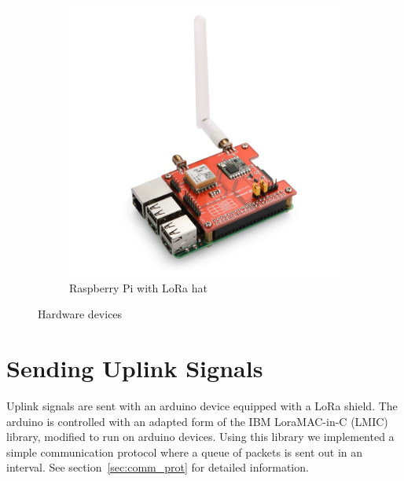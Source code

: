 \begin{figure}[H]
\begin{subfigure}[b]{0.25\textwidth}
     \label{fig:sdr}
    \end{subfigure}
    \hspace{2em}
    \begin{subfigure}[b]{0.25\textwidth}
     \includegraphics[width=1\textwidth]{figures/raspberry.png}
     \caption{Raspberry Pi with LoRa hat}
     \label{fig:rasp}
    \end{subfigure}
    \caption{Hardware devices}
\end{figure}

\section{Sending Uplink Signals}
Uplink signals are sent with an arduino device equipped with a LoRa shield. 
The arduino is controlled with an adapted form of the IBM LoraMAC-in-C (LMIC) library, modified to run on arduino devices.
Using this library we implemented a simple communication protocol where a queue of packets is sent out in an interval.
See section~\ref{sec:comm_prot} for detailed information.

